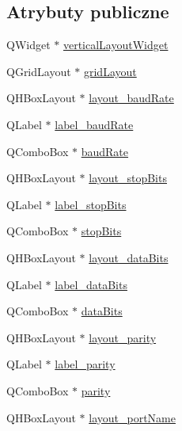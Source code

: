 \subsection*{Atrybuty publiczne}
\begin{DoxyCompactItemize}
\item 
Q\+Widget $\ast$ \hyperlink{class_ui__dialog__connection_a9372f7757af2d883db9a3594661d964a}{vertical\+Layout\+Widget}
\item 
Q\+Grid\+Layout $\ast$ \hyperlink{class_ui__dialog__connection_a79f8aad8f23f86db28c9d5a596d72f43}{grid\+Layout}
\item 
Q\+H\+Box\+Layout $\ast$ \hyperlink{class_ui__dialog__connection_acdd5f20a581af28510a170f5a9380b85}{layout\+\_\+baud\+Rate}
\item 
Q\+Label $\ast$ \hyperlink{class_ui__dialog__connection_a97e53ba7fd0d7a29cc4b4123ded3b692}{label\+\_\+baud\+Rate}
\item 
Q\+Combo\+Box $\ast$ \hyperlink{class_ui__dialog__connection_a5c525a5302ecd76ab17e3c63d5d31f51}{baud\+Rate}
\item 
Q\+H\+Box\+Layout $\ast$ \hyperlink{class_ui__dialog__connection_a62f60c79cdcd990ed548d6a6e808d096}{layout\+\_\+stop\+Bits}
\item 
Q\+Label $\ast$ \hyperlink{class_ui__dialog__connection_acddf7601c13b19848b103860c8737939}{label\+\_\+stop\+Bits}
\item 
Q\+Combo\+Box $\ast$ \hyperlink{class_ui__dialog__connection_ad1ae151e4923469740965114ea440b27}{stop\+Bits}
\item 
Q\+H\+Box\+Layout $\ast$ \hyperlink{class_ui__dialog__connection_ae136eec921a2600970624ba39eaf623a}{layout\+\_\+data\+Bits}
\item 
Q\+Label $\ast$ \hyperlink{class_ui__dialog__connection_a7581fc9c969ba24edd4b456c9ace0f6a}{label\+\_\+data\+Bits}
\item 
Q\+Combo\+Box $\ast$ \hyperlink{class_ui__dialog__connection_a7f81f00b74726e18071bd11deb9a214f}{data\+Bits}
\item 
Q\+H\+Box\+Layout $\ast$ \hyperlink{class_ui__dialog__connection_aaee78051757c7381a396ed60bfea5814}{layout\+\_\+parity}
\item 
Q\+Label $\ast$ \hyperlink{class_ui__dialog__connection_a02c1ace785ac0630ba6914cdb9a88047}{label\+\_\+parity}
\item 
Q\+Combo\+Box $\ast$ \hyperlink{class_ui__dialog__connection_ad3ae29436daab5f42432f905a588d639}{parity}
\item 
Q\+H\+Box\+Layout $\ast$ \hyperlink{class_ui__dialog__connection_aa435ed06e760021e3931bdcdfbf2c90e}{layout\+\_\+port\+Name}

\end{DoxyCompactItemize}
